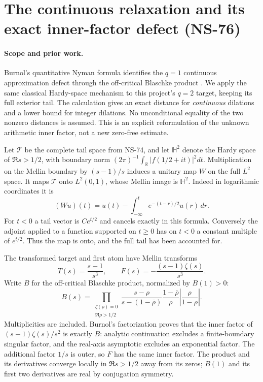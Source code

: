 \section{The continuous relaxation and its exact inner-factor defect (NS-76)}
\label{sec:ns76-inner-distance}

\paragraph{Scope and prior work.}
Burnol's quantitative Nyman formula identifies the $q=1$ continuous
approximation defect through the off-critical Blaschke product
\cite[Theorem 1.2 and Lemma 2.4]{BurnolNyman2001}. We apply the same
classical Hardy-space mechanism to this project's $q=2$ target, keeping
its full exterior tail. The calculation gives an exact distance for
\emph{continuous} dilations and a lower bound for integer dilations.
No unconditional equality of the two nonzero distances is assumed.
This is an explicit reformulation of the unknown arithmetic inner
factor, not a new zero-free estimate.

Let $\mathcal T$ be the complete tail space from NS-74, and let
$\mathbb H^2$ denote the Hardy space of $\Re s>1/2$, with boundary norm
$(2\pi)^{-1}\int_{\mathbb R}|f(1/2+it)|^2dt$.
Multiplication on the Mellin boundary by $(s-1)/s$ induces a unitary
map $W$ on the full $L^2$ space. It maps $\mathcal T$ onto
$L^2(0,1)$, whose Mellin image is $\mathbb H^2$.
Indeed in logarithmic coordinates it is
\[
 (Wu)(t)=u(t)-\int_{-\infty}^t e^{-(t-r)/2}u(r)\,dr.
\]
For $t<0$ a tail vector is $C e^{t/2}$ and cancels exactly in this
formula. Conversely the adjoint applied to a function supported on
$t\geq0$ has on $t<0$ a constant multiple of $e^{t/2}$.
Thus the map is onto, and the full tail has been accounted for.

The transformed target and first atom have Mellin transforms
\[
 T(s)=\frac{s-1}{s^3},\qquad
 F(s)=-\frac{(s-1)\zeta(s)}{s^3}.
\]
Write $B$ for the off-critical Blaschke product, normalized by $B(1)>0$:
\[
 B(s)=\prod_{\substack{\zeta(\rho)=0\\\Re\rho>1/2}}
 \frac{s-\rho}{s-(1-\overline\rho)}
 \frac{1-\overline\rho}{\rho}
 \left|\frac{\rho}{1-\rho}\right|.
\]
Multiplicities are included. Burnol's factorization proves that the
inner factor of $(s-1)\zeta(s)/s^2$ is exactly $B$: analytic
continuation excludes a finite-boundary singular factor, and the
real-axis asymptotic excludes an exponential factor. The additional
factor $1/s$ is outer, so $F$ has the same inner factor. The product
and its derivatives converge locally in $\Re s>1/2$ away from its
zeros; $B(1)$ and its first two derivatives are real by conjugation
symmetry.

